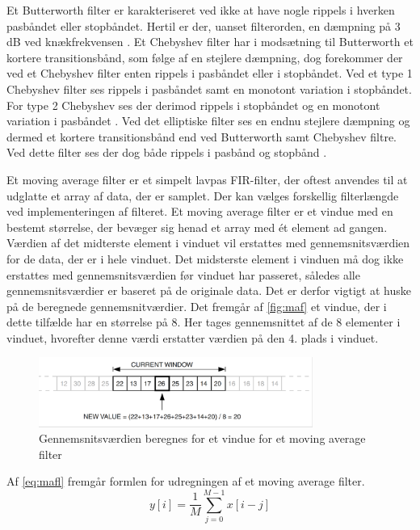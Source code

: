 \noindent
Et Butterworth filter er karakteriseret ved ikke at have nogle rippels i hverken pasbåndet eller stopbåndet. Hertil er der, uanset filterorden, en dæmpning på 3 dB ved knækfrekvensen \citep{nilsson2015}.
Et Chebyshev filter har i modsætning til Butterworth et kortere transitionsbånd, som følge af en stejlere dæmpning, dog forekommer der ved et Chebyshev filter enten rippels i pasbåndet eller i stopbåndet. Ved et type 1 Chebyshev filter ses rippels i pasbåndet samt en monotont variation i stopbåndet. For type 2 Chebyshev ses der derimod rippels i stopbåndet og en monotont variation i pasbåndet \citep{nilsson2015}. 
Ved det elliptiske filter ses en endnu stejlere dæmpning og dermed et kortere transitionsbånd end ved Butterworth samt Chebyshev filtre. Ved dette filter ses der dog både rippels i pasbånd og stopbånd \citep{nilsson2015}. 

\vspace{3mm}
\noindent
Et moving average filter er et simpelt lavpas FIR-filter, der oftest anvendes til at udglatte et array af data, der er samplet. Der kan vælges forskellig filterlængde ved implementeringen af filteret. Et moving average filter er et vindue med en bestemt størrelse, der bevæger sig henad et array med ét element ad gangen. Værdien af det midterste element i vinduet vil erstattes med gennemsnitsværdien for de data, der er i hele vinduet. Det midsterste element i vinduen må dog ikke erstattes med gennemsnitsværdien før vinduet har passeret, således alle gennemsnitsværdier er baseret på de originale data. Det er derfor vigtigt at huske på de beregnede gennemsnitværdier. Det fremgår af \autoref{fig:maf} et vindue, der i dette tilfælde har en størrelse på 8. Her tages gennemsnittet af de 8 elementer i vinduet, hvorefter denne værdi erstatter værdien på den 4. plads i vinduet.\citep{atmel2002}

\begin{figure} [H]
\centering
\includegraphics[width=0.8\textwidth]{figures/maf}
\caption{Gennemsnitsværdien beregnes for et vindue for et moving average filter}
\label{fig:maf}
\end{figure} 

Af \autoref{eq:mafl} fremgår formlen for udregningen af et moving average filter. 
\begin{equation}
y[i]=\dfrac{1}{M}\sum^{M-1}_{j=0} x[i-j]
\label{eq:mafl}
\end{equation}

